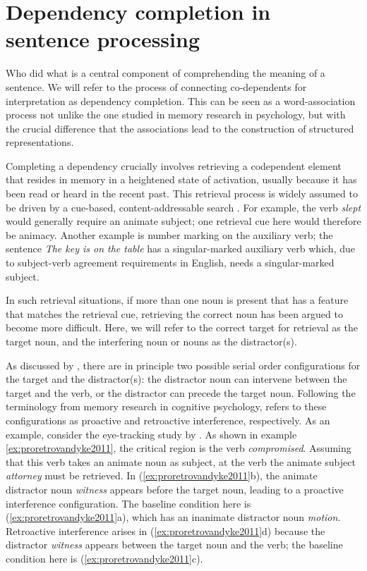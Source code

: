 \documentclass{cambridge7A}\usepackage[]{graphicx}\usepackage[]{color}
\begin{document}
 \section{Dependency completion in sentence processing} 

Who did what is a central component of comprehending the meaning of a sentence. We will refer to the process of connecting co-dependents for interpretation as  dependency completion.  This can be seen as a word-association process not unlike the one studied in memory research in psychology, but with the crucial difference that the associations lead to the construction of structured representations. 

 Completing a dependency crucially involves retrieving a codependent element that resides in memory in a heightened state of activation, usually because it has been read or heard in the recent past. 
  This retrieval process is widely assumed to be driven by a  cue-based,   content-addressable search \citep{McElreeForakerDyer2003}. For example, the verb \textit{slept} would  generally require an animate subject; one retrieval cue here would therefore be animacy. Another example is number marking on the auxiliary verb; the sentence \textit{The key is on the table} has a singular-marked auxiliary verb which, due to subject-verb agreement requirements in English, needs a singular-marked subject. 
  
In such retrieval situations, if more than one noun is present that has a feature that matches the retrieval cue, retrieving the correct noun has been argued to become more difficult.  Here, we will refer to the correct target for retrieval as the target noun, and the interfering noun or nouns as the distractor(s). 
  
As discussed by \cite{lewis:magical},  there are in principle two possible serial order configurations for the target and the distractor(s): the distractor  noun can intervene between the target and the verb, or the distractor can precede the target noun.
Following the terminology from memory research in cognitive psychology, \cite{lewis:magical} refers to these configurations  as  proactive  and retroactive interference, respectively. 
As an example, consider the eye-tracking study by
\cite{VanDykeMcElree2011}.
As shown in example \ref{ex:proretrovandyke2011}, the critical region is the verb \textit{compromised}.
Assuming that this verb takes an animate noun as subject, 
at the verb the animate subject \textit{attorney} must be retrieved. In 
(\ref{ex:proretrovandyke2011}b), the animate distractor noun \textit{witness} appears before the target noun, leading to a proactive interference configuration. The baseline condition here is (\ref{ex:proretrovandyke2011}a), which has an inanimate distractor noun \textit{motion}.   
Retroactive interference arises in (\ref{ex:proretrovandyke2011}d) because the distractor \textit{witness} appears between the target noun and the verb; the baseline condition here is (\ref{ex:proretrovandyke2011}c).
\end{document}

